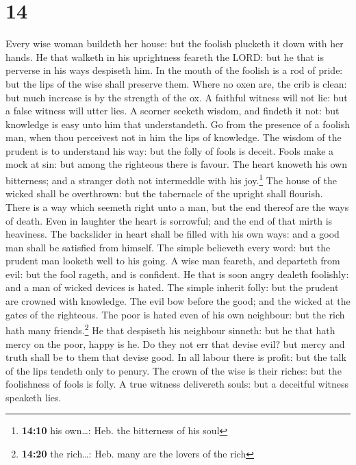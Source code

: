 \hypertarget{section-13}{%
\section{14}\label{section-13}}

 Every wise woman buildeth her house: but the foolish
plucketh it down with her hands.  He that walketh in his
uprightness feareth the LORD: but he that is perverse in his ways
despiseth him.  In the mouth of the foolish is a rod of
pride: but the lips of the wise shall preserve them. 
Where no oxen are, the crib is clean: but much increase is by the
strength of the ox.  A faithful witness will not lie: but
a false witness will utter lies.  A scorner seeketh
wisdom, and findeth it not: but knowledge is easy unto him that
understandeth.  Go from the presence of a foolish man,
when thou perceivest not in him the lips of knowledge. 
The wisdom of the prudent is to understand his way: but the folly of
fools is deceit.  Fools make a mock at sin: but among the
righteous there is favour.  The heart knoweth his own
bitterness; and a stranger doth not intermeddle with his joy.\footnote{\textbf{14:10}
  his own\ldots: Heb. the bitterness of his soul}  The
house of the wicked shall be overthrown: but the tabernacle of the
upright shall flourish.  There is a way which seemeth
right unto a man, but the end thereof are the ways of death.
 Even in laughter the heart is sorrowful; and the end of
that mirth is heaviness.  The backslider in heart shall
be filled with his own ways: and a good man shall be satisfied from
himself.  The simple believeth every word: but the
prudent man looketh well to his going.  A wise man
feareth, and departeth from evil: but the fool rageth, and is confident.
 He that is soon angry dealeth foolishly: and a man of
wicked devices is hated.  The simple inherit folly: but
the prudent are crowned with knowledge.  The evil bow
before the good; and the wicked at the gates of the righteous.
 The poor is hated even of his own neighbour: but the
rich hath many friends.\footnote{\textbf{14:20} the rich\ldots: Heb.
  many are the lovers of the rich}  He that despiseth his
neighbour sinneth: but he that hath mercy on the poor, happy is he.
 Do they not err that devise evil? but mercy and truth
shall be to them that devise good.  In all labour there
is profit: but the talk of the lips tendeth only to penury.
 The crown of the wise is their riches: but the
foolishness of fools is folly.  A true witness delivereth
souls: but a deceitful witness speaketh lies.

